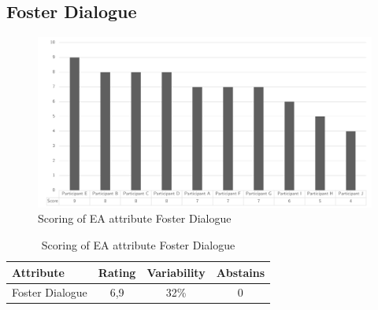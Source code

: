 \subsection{Foster Dialogue}
\begin{figure}[H]
	\centering
	\includegraphics[width=0.9\linewidth]{images/scoreeafosterdialogue}
	\caption[Scoring of EA attribute Foster Dialogue]{Scoring of EA attribute Foster Dialogue}
	\label{fig:appscoringeafosterdialogue}
\end{figure}
\begin{table}[H]
	\centering
	\begin{tabular}{p{}ccc}
		\toprule
		\textbf{Attribute} & \textbf{Rating} & \textbf{Variability} & \textbf{Abstains} \\
		\midrule
		Foster Dialogue & 6,9 & 32\% & 0 \\%
		\bottomrule
	\end{tabular}%
	\caption[Scoring of EA attribute Foster Dialogue]{Scoring of EA attribute Foster Dialogue}
	\label{tab:appscoringeafosterdialogue}%
\end{table}%
\newpage
